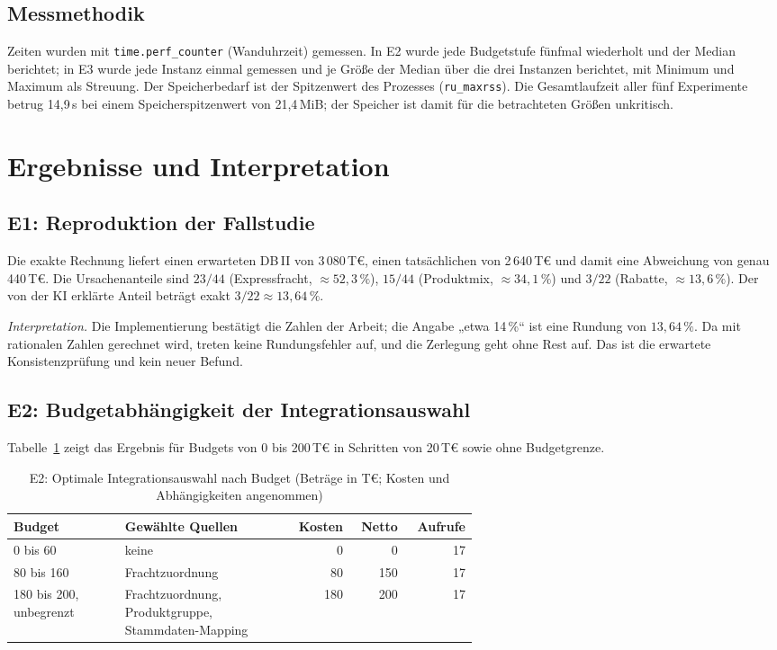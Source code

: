 \documentclass[a4paper,12pt,twoside]{report}
\theoremstyle{definition}
\begin{document}
\subsection{Messmethodik}
Zeiten wurden mit \texttt{time.perf\_counter} (Wanduhrzeit) gemessen. In E2 wurde jede Budgetstufe fünfmal wiederholt und der Median berichtet; in E3 wurde jede Instanz einmal gemessen und je Größe der Median über die drei Instanzen berichtet, mit Minimum und Maximum als Streuung. Der Speicherbedarf ist der Spitzenwert des Prozesses (\texttt{ru\_maxrss}). Die Gesamtlaufzeit aller fünf Experimente betrug 14{,}9\,s bei einem Speicherspitzenwert von 21{,}4\,MiB; der Speicher ist damit für die betrachteten Größen unkritisch.

\section{Ergebnisse und Interpretation}

\subsection{E1: Reproduktion der Fallstudie}
Die exakte Rechnung liefert einen erwarteten DB\,II von 3\,080\,T€, einen tatsächlichen von 2\,640\,T€ und damit eine Abweichung von genau 440\,T€. Die Ursachenanteile sind $23/44$ (Expressfracht, $\approx 52{,}3\,\%$), $15/44$ (Produktmix, $\approx 34{,}1\,\%$) und $3/22$ (Rabatte, $\approx 13{,}6\,\%$). Der von der KI erklärte Anteil beträgt exakt $3/22\approx 13{,}64\,\%$.

\emph{Interpretation.} Die Implementierung bestätigt die Zahlen der Arbeit; die Angabe „etwa 14\,\%“ ist eine Rundung von $13{,}64\,\%$. Da mit rationalen Zahlen gerechnet wird, treten keine Rundungsfehler auf, und die Zerlegung geht ohne Rest auf. Das ist die erwartete Konsistenzprüfung und kein neuer Befund.

\subsection{E2: Budgetabhängigkeit der Integrationsauswahl}
Tabelle~\ref{tab:e2} zeigt das Ergebnis für Budgets von 0 bis 200\,T€ in Schritten von 20\,T€ sowie ohne Budgetgrenze.

\begin{table}[htbp]
\centering
\small
\caption{E2: Optimale Integrationsauswahl nach Budget (Beträge in T€; Kosten und Abhängigkeiten angenommen)}
\label{tab:e2}
\begin{tabular}{p{0.24\linewidth}p{0.36\linewidth}rrr}
\toprule
\textbf{Budget} & \textbf{Gewählte Quellen} & \textbf{Kosten} & \textbf{Netto} & \textbf{Aufrufe} \\
\midrule
0 bis 60 & keine & 0 & 0 & 17 \\
80 bis 160 & Frachtzuordnung & 80 & 150 & 17 \\
180 bis 200, unbegrenzt & Frachtzuordnung, Produktgruppe, Stammdaten-Mapping & 180 & 200 & 17 \\
\bottomrule
\end{tabular}
\end{table}
\end{document}
